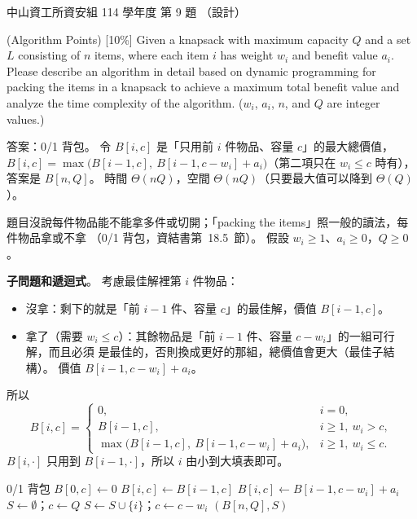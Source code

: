 \begin{pastexam}[label={px:nsysu-114-dmalg-08}]{中山資工所資安組 114 學年度 第 9 題}
（設計）

(Algorithm Points) {[10\%]} Given a knapsack with maximum capacity $Q$ and a set $L$ consisting of
$n$ items, where each item $i$ has weight $w_i$ and benefit value $a_i$. Please describe an
algorithm in detail based on dynamic programming for packing the items in a knapsack to achieve a
maximum total benefit value and analyze the time complexity of the algorithm. ($w_i$, $a_i$, $n$,
and $Q$ are integer values.)
\end{pastexam}

\begin{pastsoln}
答案：0/1 背包。 令 $B[i, c]$ 是「只用前 $i$ 件物品、容量 $c$」的最大總價值，
$B[i, c] = \max\bigl(B[i-1, c],\ B[i-1, c - w_i] + a_i\bigr)$（第二項只在 $w_i \le c$ 時有），
答案是 $B[n, Q]$。 時間 $\Theta(nQ)$，空間 $\Theta(nQ)$（只要最大值可以降到 $\Theta(Q)$）。

題目沒說每件物品能不能拿多件或切開；「packing the items」照一般的讀法，每件物品拿或不拿
（0/1 背包，資結書第~18.5~節）。 假設 $w_i \ge 1$、$a_i \ge 0$，$Q \ge 0$。

\textbf{子問題和遞迴式}。 考慮最佳解裡第 $i$ 件物品：
\begin{itemize}
\item 沒拿：剩下的就是「前 $i - 1$ 件、容量 $c$」的最佳解，價值 $B[i-1, c]$。
\item 拿了（需要 $w_i \le c$）：其餘物品是「前 $i - 1$ 件、容量 $c - w_i$」的一組可行解，而且必須
是最佳的，否則換成更好的那組，總價值會更大（最佳子結構）。 價值 $B[i-1, c - w_i] + a_i$。
\end{itemize}
所以
\[
B[i, c] =
\begin{cases}
0, & i = 0, \\
B[i-1, c], & i \ge 1,\ w_i > c, \\
\max\bigl(B[i-1, c],\ B[i-1, c - w_i] + a_i\bigr), & i \ge 1,\ w_i \le c .
\end{cases}
\]
$B[i, \cdot]$ 只用到 $B[i-1, \cdot]$，所以 $i$ 由小到大填表即可。

\begin{pseudo}{0/1 背包}
        \State $B[0, c] \gets 0$
    \EndFor
            \State $B[i, c] \gets B[i - 1, c]$ 
                \State $B[i, c] \gets B[i - 1, c - w_i] + a_i$ 
            \EndIf
        \EndFor
    \EndFor
    \State $S \gets \emptyset$；$c \gets Q$ 
            \State $S \gets S \cup \{i\}$；$c \gets c - w_i$
        \EndIf
    \EndFor
    \State \Return $(B[n, Q], S)$
\EndFunction
\end{pseudo}


\end{pastsoln}
